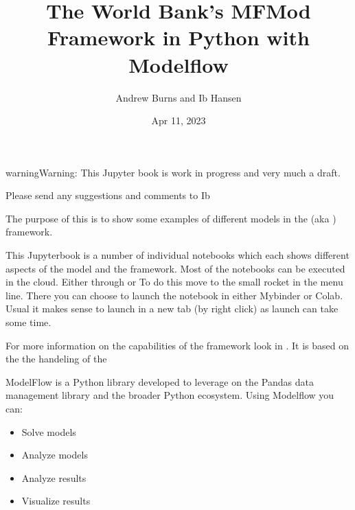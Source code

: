 \documentclass[letterpaper,10pt,english]{jupyterBook}
\title{The World Bank's MFMod Framework in Python with Modelflow}
\date{Apr 11, 2023}
\author{Andrew Burns and Ib Hansen}
\begin{document}
\pagestyle{empty}
\sphinxmaketitle
\pagestyle{plain}
\sphinxtableofcontents
\pagestyle{normal}
\label{\detokenize{content/introduction::doc}}


\begin{sphinxadmonition}{warning}{Warning:}
\sphinxAtStartPar
This Jupyter book is work in progress and very much a draft.

\sphinxAtStartPar
Please send any suggestions and comments to Ib
\end{sphinxadmonition}

\sphinxAtStartPar
The purpose of this  is to show some examples of different models in the  (aka ) framework.

\sphinxAtStartPar
This Jupyterbook is  a number of individual notebooks which each shows different aspects of the model and the framework. Most of the notebooks can be executed in the cloud. Either through  or  To do this move to the small rocket in the menu line. There you can choose to launch the notebook in either Mybinder or Colab. Usual it makes sense to launch in a new tab (by right click) as launch can take some time.

\sphinxAtStartPar
For more information on the capabilities of the framework look in . It is based on the
the handeling of the 

\sphinxAtStartPar
ModelFlow is a Python library developed to leverage on the Pandas data management library and the broader Python ecosystem. Using Modelflow you can:
\begin{itemize}
\item {} 
\sphinxAtStartPar
Solve models

\item {} 
\sphinxAtStartPar
Analyze models

\item {} 
\sphinxAtStartPar
Analyze results

\item {} 
\sphinxAtStartPar
Visualize results

\end{itemize}
\end{document}
